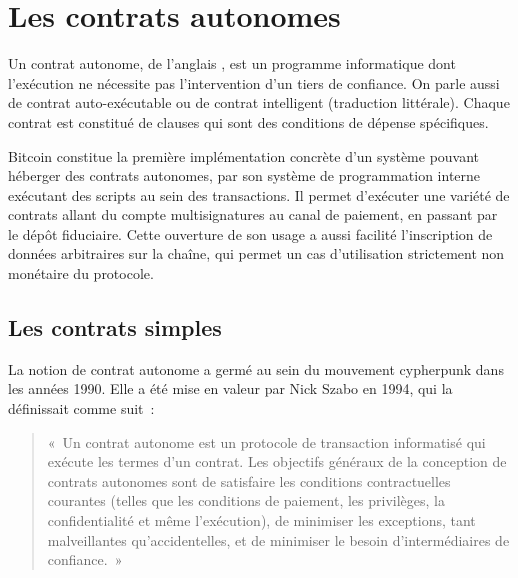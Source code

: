 
\chapter{Les contrats autonomes}
\label{ch:contrats}

Un contrat autonome, de l'anglais , est un programme informatique dont l'exécution ne nécessite pas l'intervention d'un tiers de confiance. On parle aussi de contrat auto-exécutable ou de contrat intelligent (traduction littérale). Chaque contrat est constitué de clauses qui sont des conditions de dépense spécifiques.

Bitcoin constitue la première implémentation concrète d'un système pouvant héberger des contrats autonomes, par son système de programmation interne exécutant des scripts au sein des transactions. Il permet d'exécuter une variété de contrats allant du compte multisignatures au canal de paiement, en passant par le dépôt fiduciaire. Cette ouverture de son usage a aussi facilité l'inscription de données arbitraires sur la chaîne, qui permet un cas d'utilisation strictement non monétaire du protocole.

\section*{Les contrats simples}

La notion de contrat autonome a germé au sein du mouvement cypherpunk dans les années 1990. Elle a été mise en valeur par Nick Szabo en 1994, qui la définissait comme suit~:

\begin{quote}
«~Un contrat autonome est un protocole de transaction informatisé qui exécute les termes d'un contrat. Les objectifs généraux de la conception de contrats autonomes sont de satisfaire les conditions contractuelles courantes (telles que les conditions de paiement, les privilèges, la confidentialité et même l'exécution), de minimiser les exceptions, tant malveillantes qu'accidentelles, et de minimiser le besoin d'intermédiaires de confiance.~»
\end{quote} %


